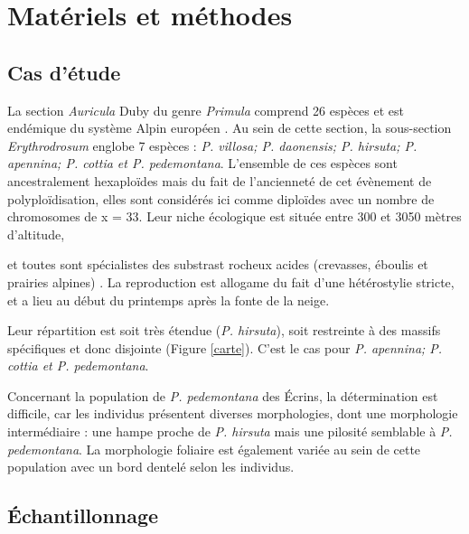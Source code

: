 
\section{Matériels et méthodes}

\subsection{Cas d'étude}

La section \textit{Auricula} Duby du genre \textit{Primula} comprend 26 espèces et est endémique du système Alpin européen \citep{Ozenda1995}. Au sein de cette section, la sous-section \textit{Erythrodrosum} englobe 7 espèces : \textit{P. villosa; P. daonensis; P. hirsuta; P. apennina; P. cottia et P. pedemontana}. L'ensemble de ces espèces sont ancestralement hexaploïdes mais du fait de l'ancienneté de cet évènement de polyploïdisation, elles sont considérés ici comme diploïdes avec un nombre de chromosomes de x = 33. Leur niche écologique est située entre 300 et 3050 mètres d'altitude,

 et toutes sont spécialistes des substrast rocheux acides (crevasses, éboulis et prairies alpines) \citep{Zhang2004}. La reproduction est allogame
 du fait d'une hétérostylie stricte, et a lieu au début du printemps après la fonte de la neige.

Leur répartition est soit très étendue (\textit{P. hirsuta}), soit restreinte à des massifs spécifiques et donc disjointe (Figure \ref{carte}). C'est le cas pour \textit{P. apennina; P. cottia et P. pedemontana}.

Concernant la population de \textit{P. pedemontana} des Écrins, la détermination est difficile, car les individus présentent diverses morphologies, dont une morphologie intermédiaire : une hampe proche de \textit{P. hirsuta} mais une pilosité semblable à \textit{P. pedemontana}. La morphologie foliaire est également variée au sein de cette population avec un bord dentelé selon les individus.

\subsection{Échantillonnage}

